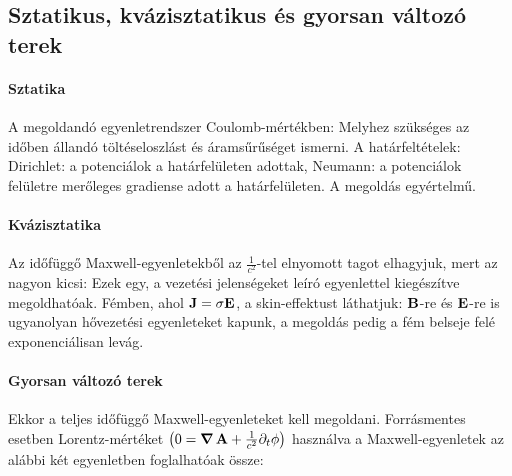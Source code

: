    
  \subsection{Sztatikus, kvázisztatikus és gyorsan változó terek}\label{ss:01-eldidofugges}
   
   \paragraph{Sztatika}
   
    A megoldandó egyenletrendszer Coulomb-mértékben:
    Melyhez szükséges az időben állandó töltéseloszlást és áramsűrűséget ismerni. A határfeltételek: Dirichlet: a potenciálok a határfelületen adottak, Neumann: a potenciálok felületre merőleges gradiense adott a határfelületen. A megoldás egyértelmű. 
  
   \paragraph{Kvázisztatika}
    
    Az időfüggő Maxwell-egyenletekből az $\frac{1}{c^2}$-tel elnyomott tagot elhagyjuk, mert az nagyon kicsi:
    Ezek egy, a vezetési jelenségeket leíró egyenlettel kiegészítve megoldhatóak. Fémben, ahol $\mathbf{J}=\sigma\mathbf{E}$, a skin-effektust láthatjuk: $\mathbf{B}$-re és $\mathbf{E}$-re is ugyanolyan hővezetési egyenleteket kapunk, a megoldás pedig a fém belseje felé exponenciálisan levág. 
    
   \paragraph{Gyorsan változó terek}
    
    Ekkor a teljes időfüggő Maxwell-egyenleteket kell megoldani. Forrásmentes esetben Lorentz-mértéket $\left(0=\mathop{\boldsymbol{\nabla}}\nolimits \mathbf{A}+\frac{1}{c^2}\partial_t\phi\right)$ használva a Maxwell-egyenletek az alábbi két egyenletben foglalhatóak össze:
    
